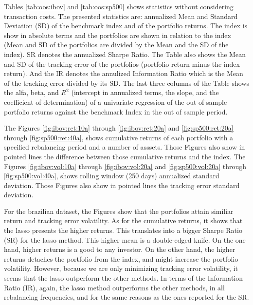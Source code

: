 \documentclass[preprint,authoryear,review,12pt]{elsarticle}
\begin{document}

Tables \ref{tab:oos:ibov} and \ref{tab:oos:sp500} shows statistics without considering transaction costs.
The presented statistics are: annualized Mean and Standard Deviation (SD) of the benchmark index and of the portfolio returns.
The index is show in absolute terms and the portfolios are shown in relation to the index (Mean and SD of the portfolios are divided by the Mean and the SD of the index).
SR denotes the annualized Sharpe Ratio.
The Table also shows the Mean and SD of the tracking error of the portfolios (portfolio return minus the index return).
And the IR denotes the annulized Information Ratio which is the Mean of the tracking error divided by its SD.
The last three columns of the Table shows the alfa, beta, and $R^2$ (intercept in annualized terms, the slope, and the coefficient of determination) of a univariate regression of the out of sample portfolio returns against the benchmark Index in the out of sample period.

The Figures \ref{fig:ibov:ret:10a} through \ref{fig:ibov:ret:20a} and \ref{fig:sp500:ret:20a} through \ref{fig:sp500:ret:40a}, shows cumulative returns of each portfolio with a specified rebalancing period and a number of asssets.
Those Figures also show in pointed lines the difference between those cumulative returns and the index.
The Figures \ref{fig:ibov:vol:10a} through \ref{fig:ibov:vol:20a} and \ref{fig:sp500:vol:20a} through \ref{fig:sp500:vol:40a}, shows rolling window (250 days) annualized standard deviation.
Those Figures also show in pointed lines the tracking error standard deviation.

For the brazilian dataset, the Figures show that the portfolios attain similiar return and tracking error volatility.
As for the cumulative returns, it shows that the lasso presents the higher returns.
This translates into a bigger Sharpe Ratio (SR) for the lasso method.
This higher mean is a double-edged knife.
On the one hand, higher returns is a good to any investor.
On the other hand, the higher returns detaches the portfolio from the index, and might increase the portfolio volatility.
However, because we are only minimizing tracking error volatility, it seems that the lasso outperform the other methods.
In terms of the Information Ratio (IR), again, the lasso method outperforms the other methods, in all rebalancing frequencies, and for the same reasons as the ones reported for the SR.
\end{document}
